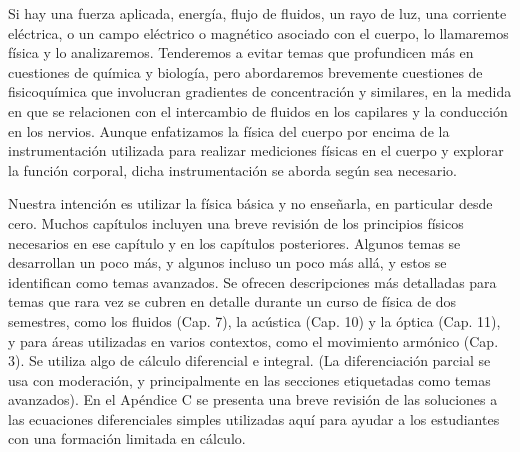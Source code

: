 ﻿\documentclass{book}
\begin{document}
Si hay una fuerza aplicada, energía, flujo de fluidos, un rayo de luz, una corriente eléctrica, o un campo eléctrico o magnético asociado con el cuerpo, lo llamaremos física y lo analizaremos. Tenderemos a evitar temas que profundicen más en cuestiones de química y biología, pero abordaremos brevemente cuestiones de fisicoquímica que involucran gradientes de concentración y similares, en la medida en que se relacionen con el intercambio de fluidos en los capilares y la conducción en los nervios. Aunque enfatizamos la física del cuerpo por encima de la instrumentación utilizada para realizar mediciones físicas en el cuerpo y explorar la función corporal, dicha instrumentación se aborda según sea necesario.

Nuestra intención es utilizar la física básica y no enseñarla, en particular desde cero. Muchos capítulos incluyen una breve revisión de los principios físicos necesarios en ese capítulo y en los capítulos posteriores. Algunos temas se desarrollan un poco más, y algunos incluso un poco más allá, y estos se identifican como temas avanzados. Se ofrecen descripciones más detalladas para temas que rara vez se cubren en detalle durante un curso de física de dos semestres, como los fluidos (Cap. 7), la acústica (Cap. 10) y la óptica (Cap. 11), y para áreas utilizadas en varios contextos, como el movimiento armónico (Cap. 3). Se utiliza algo de cálculo diferencial e integral. (La diferenciación parcial se usa con moderación, y principalmente en las secciones etiquetadas como temas avanzados). En el Apéndice C se presenta una breve revisión de las soluciones a las ecuaciones diferenciales simples utilizadas aquí para ayudar a los estudiantes con una formación limitada en cálculo.
\end{document}
